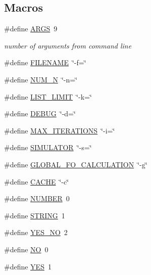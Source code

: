 \subsection*{Macros}
\begin{DoxyCompactItemize}
\item 
\#define \hyperlink{optjrParam__helper_8hh_aff1b09d6630c6c0942f78171e74c1b9d}{A\-R\-G\-S}~9
\begin{DoxyCompactList}\small\item\em number of arguments from command line \end{DoxyCompactList}\item 
\#define \hyperlink{optjrParam__helper_8hh_a8de29f7c8bbf1a81cc6e71ac602032d3}{F\-I\-L\-E\-N\-A\-M\-E}~\char`\"{}-\/f=\char`\"{}
\item 
\#define \hyperlink{optjrParam__helper_8hh_a4f7be859c7225cea6daef529ce8b737a}{N\-U\-M\-\_\-\-N}~\char`\"{}-\/n=\char`\"{}
\item 
\#define \hyperlink{optjrParam__helper_8hh_aaf0b4413f90241f1be4ff1235595706f}{L\-I\-S\-T\-\_\-\-L\-I\-M\-I\-T}~\char`\"{}-\/k=\char`\"{}
\item 
\#define \hyperlink{optjrParam__helper_8hh_ad72dbcf6d0153db1b8d8a58001feed83}{D\-E\-B\-U\-G}~\char`\"{}-\/d=\char`\"{}
\item 
\#define \hyperlink{optjrParam__helper_8hh_a0a3abbca80bc98e7abcb3ae73abe0f14}{M\-A\-X\-\_\-\-I\-T\-E\-R\-A\-T\-I\-O\-N\-S}~\char`\"{}-\/i=\char`\"{}
\item 
\#define \hyperlink{optjrParam__helper_8hh_ad8a5d8c4e3342fb668142df792e93f38}{S\-I\-M\-U\-L\-A\-T\-O\-R}~\char`\"{}-\/s=\char`\"{}
\item 
\#define \hyperlink{optjrParam__helper_8hh_a48549690ff4f612c62edddb87aacc438}{G\-L\-O\-B\-A\-L\-\_\-\-F\-O\-\_\-\-C\-A\-L\-C\-U\-L\-A\-T\-I\-O\-N}~\char`\"{}-\/g\char`\"{}
\item 
\#define \hyperlink{optjrParam__helper_8hh_a43fd55aa78bd891ebbd6a450f5eecce4}{C\-A\-C\-H\-E}~\char`\"{}-\/c\char`\"{}
\item 
\#define \hyperlink{optjrParam__helper_8hh_abc544a4ed22112e62773c113652c5063}{N\-U\-M\-B\-E\-R}~0
\item 
\#define \hyperlink{optjrParam__helper_8hh_a0f4d394a3ab4e09bff60f714c66dc5ee}{S\-T\-R\-I\-N\-G}~1
\item 
\#define \hyperlink{optjrParam__helper_8hh_a0966d7215d44b0eb30c4082965114e45}{Y\-E\-S\-\_\-\-N\-O}~2
\item 
\#define \hyperlink{optjrParam__helper_8hh_a996bde01ecac342918f0a2c4e7ce7bd5}{N\-O}~0
\item 
\#define \hyperlink{optjrParam__helper_8hh_a7ebc9a785e5ab85457c98595aac81589}{Y\-E\-S}~1
\end{DoxyCompactItemize}
